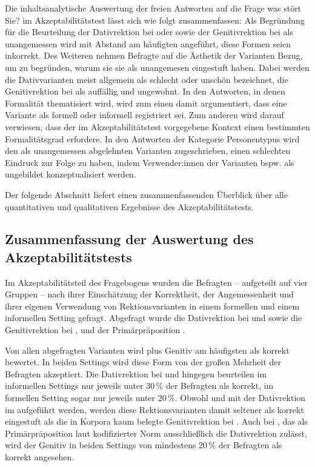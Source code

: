 Die inhaltsanalytische Auswertung der freien Antworten auf die Frage \glqq was stört Sie?\grqq{} im Akzeptabilitätstest lässt sich wie folgt zusammenfassen:
Als Begründung für die Beurteilung der Dativrektion bei \wegen{} oder \waehrend{} sowie der Genitivrektion bei \gegenueber{} als unangemessen wird mit Abstand am häufigten angeführt, diese Formen seien inkorrekt. 
Des Weiteren nehmen Befragte auf die Ästhetik der Varianten Bezug, um zu begründen, warum sie sie als unangemesen eingestuft haben. 
Dabei werden die Dativvarianten meist allgemein als schlecht oder unschön bezeichnet, die Genitivrektion bei \gegenueber{} als auffällig und ungewohnt. 
In den Antworten, in denen Formalität thematisiert wird, wird zum einen damit argumentiert, dass eine Variante als formell oder informell {re\-gis\-triert} sei. 
Zum anderen wird darauf verwiesen, dass der im Akzeptabilitätstest vorgegebene Kontext einen bestimmten Formalitätsgrad erfordere. 
In den Antworten der Kategorie \glqq Personentypus\grqq{} wird den als unangemessen abgelehnten Varianten zugeschrieben, einen schlechten Eindruck zur Folge zu haben, indem Verwender:innen der Varianten bspw. als ungebildet konzeptualisiert werden.

Der folgende Abschnitt liefert einen zusammenfassenden Überblick über alle quantitativen und qualitativen Ergebnisse des Akzeptabilitätstests. 
\subsection{Zusammenfassung der Auswertung des Akzeptabilitätstests}
\label{sec:ZsfsgAkz}
Im Akzeptabilitätsteil des Fragebogens wurden die Befragten -- aufgeteilt auf vier Gruppen -- nach ihrer Einschätzung der Korrektheit, der Angemessenheit und ihrer eigenen Verwendung von Rektionsvarianten in einem formellen und einem informellen Setting gefragt.
Abgefragt wurde die Dativrektion bei \wegen{} und \waehrend{} sowie die Genitivrektion bei \dank{}, \gegenueber{} und der Primärpräposition .

Von allen abgefragten Varianten wird \dank{} plus Genitiv am häufigsten als korrekt bewertet. 
In beiden Settings wird diese Form von der großen Mehrheit der Befragten akzeptiert. 
Die Dativrektion bei \wegen{} und \waehrend{} hingegen beurteilen im informellen Settings nur jeweils unter 30\,\% der Befragten als korrekt, im formellen Setting sogar nur jeweils unter 20\,\%. 
Obwohl \wegen{} und \waehrend{} mit der Dativrektion im \citet[{\S}1450]{Duden2022} aufgeführt werden, werden diese Rektionsvarianten damit seltener als korrekt eingestuft als die in Korpora kaum belegte Genitivrektion bei \gegenueber{}. 
Auch bei , das als Primärpräposition laut kodifizierter Norm ausschließlich die Dativrektion zulässt, wird der Genitiv in beiden Settings von mindestens 20\,\% der Befragten als korrekt angesehen. 

